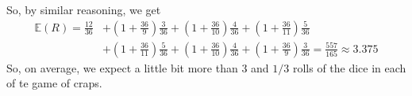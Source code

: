 \begin{mdframed}[]
\begin{mdframed}[]
\begin{enumerate}
            \bigskip 

            So, by similar reasoning, we get 
            \begin{equation*}
                \begin{aligned}
                    \mathbb{E}(R) = \frac{12}{36} &+ \left(1 + \frac{36}{9}\right) \frac{3}{36} + \left(1 + \frac{36}{10}\right) \frac{4}{36} + \left(1 + \frac{36}{11}\right) \frac{5}{36} \\ 
                        &+ \left(1 + \frac{36}{11}\right) \frac{5}{36} + \left(1 + \frac{36}{10}\right) \frac{4}{36} + \left(1 + \frac{36}{9}\right)\frac{3}{36} = \frac{557}{165} \approx 3.375
                \end{aligned}
            \end{equation*}
            So, on average, we expect a little bit more than 3 and $1/3$ rolls of the dice in each of te game of craps. 
        \end{enumerate}
    \end{mdframed}
\end{mdframed}

